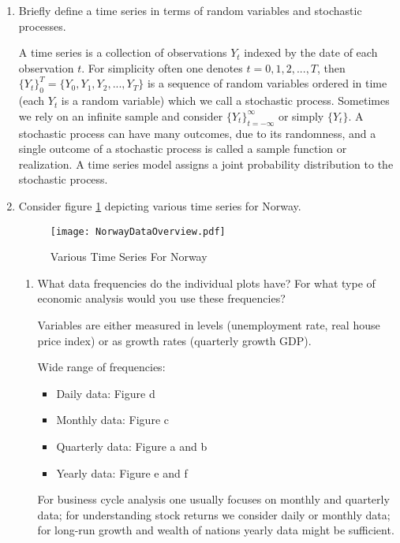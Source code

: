 \begin{enumerate}
    \item Briefly define a time series in terms of random variables and stochastic processes.
          \begin{solution}
              A time series is a collection of observations $Y_t$ indexed by the date of each observation $t$. For simplicity often one denotes $t=0,1,2,...,T$, then $\{Y_t\}_0^T = \{Y_0,Y_1,Y_2,...,Y_T\}$ is a sequence of random variables ordered in time (each $Y_t$ is a random variable) which we call a stochastic process. Sometimes we rely on an infinite sample and consider $\{Y_t\}_{t=-\infty}^\infty$ or simply $\{Y_t\}$. A stochastic process can have many outcomes, due to its randomness, and a single outcome of a stochastic process is called a sample function or realization. A time series model assigns a joint probability distribution to the stochastic process.
          \end{solution}

    \item Consider figure \ref{fig:NorwayData} depicting various time series for Norway.
          \begin{figure}[h]
              \centering
              \texttt{[image: NorwayDataOverview.pdf]}
              \caption{Various Time Series For Norway}
              \label{fig:NorwayData}
          \end{figure}

          \begin{enumerate}
              \item What data frequencies do the individual plots have? For what type of economic analysis would you use these frequencies?

                    \begin{solution}
                        Variables are either measured in levels (unemployment rate, real house price index) or as growth rates (quarterly growth GDP).

                        Wide range of frequencies:
                        \begin{itemize}
                            \item Daily data: Figure d
                            \item Monthly data: Figure c
                            \item Quarterly data: Figure a and b
                            \item Yearly data: Figure e and f
                        \end{itemize}
                        For business cycle analysis one usually focuses on monthly and quarterly data; for understanding stock returns we consider daily or monthly data; for long-run growth and wealth of nations yearly data might be sufficient.


\end{solution}
\end{enumerate}
\end{enumerate}
